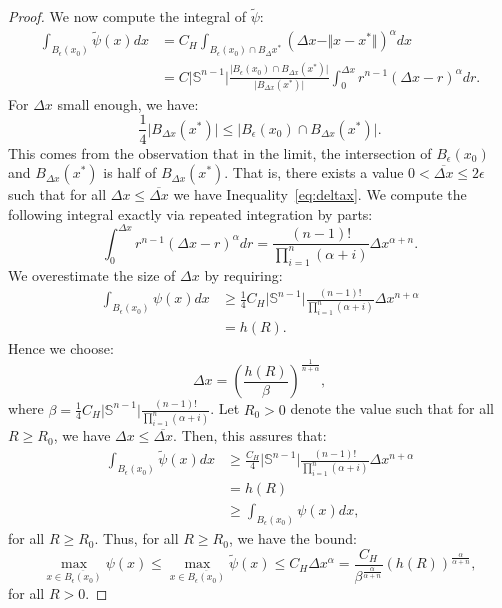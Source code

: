 \documentclass{amsart}
\theoremstyle{lemma}
\theoremstyle{remark}
\begin{document}
\begin{proof}
We now compute the integral of $\tilde{\psi}$:
\begin{align}
\int_{B_{\epsilon}(x_0)} \tilde{\psi}(x)dx &= C_{H} \int_{B_{\epsilon}(x_0) \cap B_{\Delta} x^{*}} (\Delta x - \Vert x - x^{*} \Vert)^{\alpha}dx \\
&= C\vert \mathbb{S}^{n-1} \vert \frac{\vert B_{\epsilon}(x_0) \cap B_{\Delta x}(x^{*}) \vert }{\vert B_{\Delta x}(x^{*}) \vert} \int_{0}^{\Delta x} r^{n-1} (\Delta x - r)^{\alpha}dr.
\end{align}
For $\Delta x$ small enough, we have:
\begin{equation}\label{eq:deltax}
\frac{1}{4}\vert B_{\Delta x}(x^{*}) \vert \leq \vert B_{\epsilon}(x_0) \cap B_{\Delta x}(x^{*}) \vert.
\end{equation}
This comes from the observation that in the limit, the intersection of $B_{\epsilon}(x_0)$ and $B_{\Delta x}(x^{*})$ is half of $B_{\Delta x}(x^{*})$. That is, there exists a value $0<\overline{\Delta x} \leq 2 \epsilon$ such that for all $\Delta x \leq \overline{\Delta x}$ we have Inequality~\eqref{eq:deltax}. We compute the following integral exactly via repeated integration by parts:
\begin{equation}
\int_{0}^{\Delta x} r^{n-1}(\Delta x - r)^{\alpha}dr = \frac{(n-1)!}{\prod_{i=1}^{n}(\alpha + i)}\Delta x^{\alpha + n}.
\end{equation}
We overestimate the size of $\Delta x$ by requiring:
\begin{align}
\int_{B_{\epsilon}(x_0)} \psi(x)dx &\geq \frac{1}{4} C_{H} \vert \mathbb{S}^{n-1} \vert \frac{(n-1)!}{\prod_{i=1}^{n} (\alpha + i)} \Delta x^{n + \alpha} \\
&= h(R).
\end{align}
Hence we choose:
\begin{equation}
\Delta x = \left( \frac{h(R)}{\beta} \right)^{\frac{1}{n+ \alpha}},
\end{equation}
where $\beta = \frac{1}{4} C_{H} \vert \mathbb{S}^{n-1} \vert \frac{(n-1)!}{\prod_{i=1}^{n} (\alpha + i)}$. Let $R_0>0$ denote the value such that for all $R \geq R_0$, we have $\Delta x \leq \overline{\Delta x}$. Then, this assures that:
\begin{align}
\int_{B_{\epsilon}(x_0)} \tilde{\psi}(x)dx &\geq \frac{C_{H}}{4} \vert \mathbb{S}^{n-1} \vert \frac{(n-1)!}{\prod_{i=1}^{n} (\alpha + i)} \Delta x^{n + \alpha} \\
&= h(R) \\
&\geq \int_{B_{\epsilon}(x_0)} \psi(x)dx,
\end{align}
for all $R \geq R_0$. Thus, for all $R \geq R_0$, we have the bound:
\begin{equation}
\max_{x \in \overline{B_{\epsilon}(x_0)}}\psi(x) \leq \max_{x \in \overline{B_{\epsilon}(x_0)}} \tilde{\psi}(x) \leq C_{H} \Delta x^{\alpha} = \frac{C_{H}}{\beta^{\frac{\alpha}{\alpha+n}}} (h(R))^{\frac{\alpha}{\alpha + n}},
\end{equation}
for all $R>0$.
\end{proof}
\end{document}
